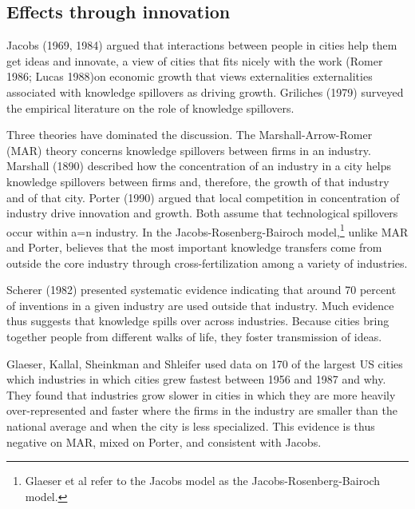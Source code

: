 \subsection{Effects through innovation}



Jacobs (1969, 1984) argued that interactions between people in cities help them get ideas and innovate, a view of cities that fits nicely with the work (Romer 1986; Lucas 1988)on economic growth that views externalities  externalities associated with knowledge spillovers as driving growth. Griliches (1979) surveyed the empirical literature on the role of knowledge spillovers. 

Three theories have dominated the discussion. The Marshall-Arrow-Romer (MAR) theory concerns knowledge spillovers between firms in an industry.  Marshall (1890) described how the concentration of an industry in a city helps knowledge
spillovers between firms and, therefore, the growth of that industry and of that city. Porter (1990) argued that local competition in concentration of industry drive innovation and growth. Both assume that technological spillovers occur within a=n industry. In the Jacobs-Rosenberg\cite{rosenbergTechnologicalChangeMachine1963}-Bairoch \cite{bairochCitiesEconomicDevelopment1988} model,\footnote{Glaeser et al \cite{glaeserGrowthCities1991} refer to the Jacobs model as the Jacobs-Rosenberg\cite{rosenbergTechnologicalChangeMachine1963}-Bairoch \cite{bairochCitiesEconomicDevelopment1988} model. } unlike MAR and Porter, believes that the most important knowledge transfers come from outside the core industry through cross-fertilization among a variety  of  industries.


Scherer (1982) presented systematic evidence indicating that around 70 percent of inventions in a given industry are used outside that industry. Much evidence thus suggests that knowledge spills over across industries. Because cities bring together people from different walks of life, they foster transmission of ideas.


Glaeser, Kallal, Sheinkman and Shleifer \cite{glaeserGrowthCities1991} used data on 170 of the largest US cities which industries in which cities grew fastest between 1956 and 1987 and why. They found that  industries grow slower in cities in which
they are more heavily over-represented and faster where the firms in the industry are smaller than the national average  and when the city is less specialized. This evidence is
thus negative on MAR, mixed on Porter, and consistent with Jacobs.

